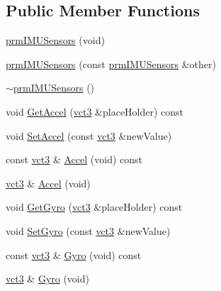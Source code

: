 \subsection*{Public Member Functions}
\begin{DoxyCompactItemize}
\item 
\hyperlink{classprm_i_m_u_sensors_a42773d9ce672b929dd6585d3fb3b76d0}{prm\-I\-M\-U\-Sensors} (void)
\item 
\hyperlink{classprm_i_m_u_sensors_a91b0cd6d0132b7a4e15060f84b9b9456}{prm\-I\-M\-U\-Sensors} (const \hyperlink{classprm_i_m_u_sensors}{prm\-I\-M\-U\-Sensors} \&other)
\item 
\hyperlink{classprm_i_m_u_sensors_aabeab69e38da2d8b0cffa5b488e9c3da}{$\sim$prm\-I\-M\-U\-Sensors} ()
\item 
void \hyperlink{classprm_i_m_u_sensors_a8290b19cc879f50e2d13e59024435106}{Get\-Accel} (\hyperlink{vct_fixed_size_vector_types_8h_a3af82acdbf4eeb73c551909240b106ea}{vct3} \&place\-Holder) const 
\item 
void \hyperlink{classprm_i_m_u_sensors_a102844d8719c94179a4bf2f84490d8d6}{Set\-Accel} (const \hyperlink{vct_fixed_size_vector_types_8h_a3af82acdbf4eeb73c551909240b106ea}{vct3} \&new\-Value)
\item 
const \hyperlink{vct_fixed_size_vector_types_8h_a3af82acdbf4eeb73c551909240b106ea}{vct3} \& \hyperlink{classprm_i_m_u_sensors_aaff439a1c2f515cb42ceba11655717d8}{Accel} (void) const 
\item 
\hyperlink{vct_fixed_size_vector_types_8h_a3af82acdbf4eeb73c551909240b106ea}{vct3} \& \hyperlink{classprm_i_m_u_sensors_a47b60889a72a7fc576ac7fb81ae11ea1}{Accel} (void)
\item 
void \hyperlink{classprm_i_m_u_sensors_a10b05337289a4ff701184ab6f75850e5}{Get\-Gyro} (\hyperlink{vct_fixed_size_vector_types_8h_a3af82acdbf4eeb73c551909240b106ea}{vct3} \&place\-Holder) const 
\item 
void \hyperlink{classprm_i_m_u_sensors_af5a9c1f1d6e62e805a725fe32edfe812}{Set\-Gyro} (const \hyperlink{vct_fixed_size_vector_types_8h_a3af82acdbf4eeb73c551909240b106ea}{vct3} \&new\-Value)
\item 
const \hyperlink{vct_fixed_size_vector_types_8h_a3af82acdbf4eeb73c551909240b106ea}{vct3} \& \hyperlink{classprm_i_m_u_sensors_aa255efe7ef9ca9f4bb1e3705c1a7cef5}{Gyro} (void) const 
\item 
\hyperlink{vct_fixed_size_vector_types_8h_a3af82acdbf4eeb73c551909240b106ea}{vct3} \& \hyperlink{classprm_i_m_u_sensors_a543d37d0a82928686b920825dac7c8df}{Gyro} (void)

\end{DoxyCompactItemize}
